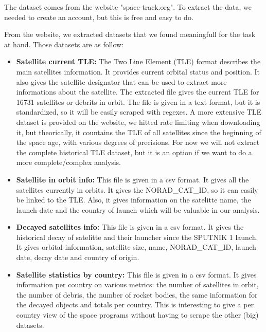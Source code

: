 \documentclass[11pt,letterpaper]{article}
\begin{document}
The dataset comes from the website "space-track.org".
To extract the data, we needed to create an account, but this is free and easy to do.

From the website, we extracted datasets that we found meaningfull for the task at hand.
Those datasets are as follow:

\begin{itemize}
    \item \textbf{Satellite current TLE:} The Two Line Element (TLE) format describes the main satellites information.
        It provides current orbital status and position. 
        It also gives the satellite designator that can be used to extract more informations about the satellite.
        The extracted file gives the current TLE for 16731 satellites or debrits in orbit.
        The file is given in a text format, but it is standardized, so it will be easily scraped with regexes.
        A more extensive TLE dataset is provided on the website, we hitted rate limiting when downloading it, but theorically,
        it countains the TLE of all satellites since the beginning of the space age, with various degrees of precisions.
        For now we will not extract the complete historical TLE dataset, but it is an option if we want to do a more complete/complex analysis.
        
    \item \textbf{Satellite in orbit info:} This file is given in a csv format.
        It gives all the satellites currently in orbits.
        It gives the NORAD\_CAT\_ID, so it can easily be linked to the TLE\@.
        Also, it gives information on the satelitte name, the launch date and the country of launch which will be valuable in our analysis.

    \item \textbf{Decayed satellites info:} This file is given in a csv format.
        It gives the historical decay of satelitte and their launcher since the SPUTNIK 1 launch.
        It gives orbital information, satellite size, name, NORAD\_CAT\_ID, launch date, decay date and country of origin.

    \item \textbf{Satellite statistics by country:} This file is given in a csv format.
        It gives information per country on various metrics: the number of satellites in orbit, the number of debris, the number of rocket bodies, the same information for the decayed objects and totals per country.
        This is interesting to give a per country view of the space programs without having to scrape the other (big) datasets.

\end{itemize}
\end{document}
